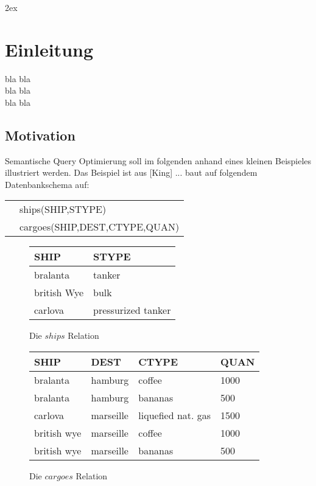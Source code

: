 \setlanguage{\german}

\topmargin 2cm
\oddsidemargin 1cm
\evensidemargin 1cm
\textwidth 15cm
\textheight 18cm



\parindent0.0cm
\parskip2ex
\itemsep0.0cm 


\chapter{Einleitung}

bla bla \\
bla bla \\
bla bla

\section{Motivation}

Semantische Query Optimierung soll im folgenden anhand eines kleinen Beispieles
illustriert werden. Das Beispiel ist aus [King] ... baut auf folgendem 
Datenbankschema auf:

\begin{tabular}{ll}
\quad & ships(SHIP,STYPE) \\
\quad & cargoes(SHIP,DEST,CTYPE,QUAN)
\end{tabular}

\begin{figure}
\begin{center}
\begin{tabular}{l|l}
SHIP & STYPE \\        
\hline 
bralanta & tanker \\            
british Wye & bulk \\               
carlova & pressurized tanker 
\end{tabular}
\end{center}
\caption{Die $ships$ Relation}
\label{tabships}
\end{figure}

\begin{figure}
\begin{center}
\begin{tabular}{l|l|l|l}
SHIP & DEST & CTYPE & QUAN \\
\hline
bralanta & hamburg & coffee & 1000 \\
bralanta & hamburg & bananas & 500 \\
carlova & marseille & liquefied nat. gas & 1500 \\
british wye & marseille & coffee & 1000 \\
british wye & marseille & bananas & 500
\end{tabular}
\end{center}
\caption{Die $cargoes$ Relation}
\label{tabcargoes}
\end{figure}

